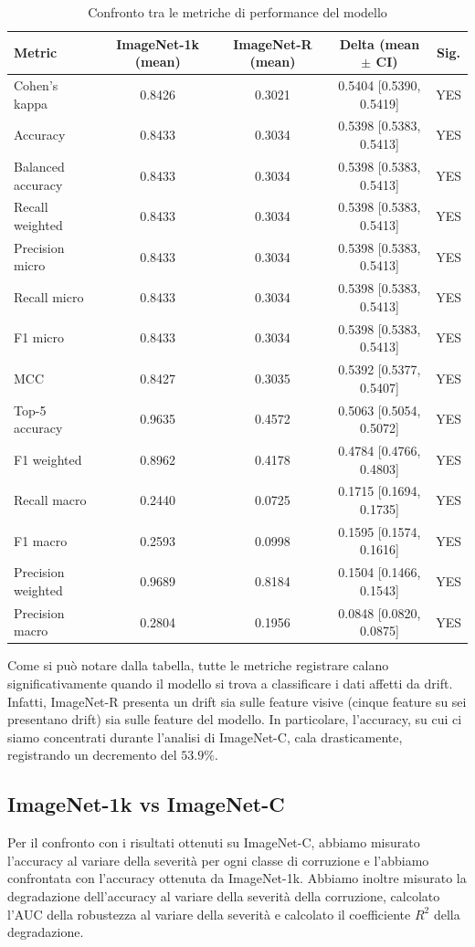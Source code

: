 \begin{table}[htbp]
\centering
\begin{tabular}{lcccc}
\hline
\textbf{Metric} & \textbf{ImageNet-1k (mean)} & \textbf{ImageNet-R (mean)} & \textbf{Delta (mean $\pm$ CI)} & \textbf{Sig.} \\
\hline
Cohen's kappa       & 0.8426 & 0.3021 & 0.5404 [0.5390, 0.5419] & YES \\
Accuracy            & 0.8433 & 0.3034 & 0.5398 [0.5383, 0.5413] & YES \\
Balanced accuracy   & 0.8433 & 0.3034 & 0.5398 [0.5383, 0.5413] & YES \\
Recall weighted     & 0.8433 & 0.3034 & 0.5398 [0.5383, 0.5413] & YES \\
Precision micro     & 0.8433 & 0.3034 & 0.5398 [0.5383, 0.5413] & YES \\
Recall micro        & 0.8433 & 0.3034 & 0.5398 [0.5383, 0.5413] & YES \\
F1 micro            & 0.8433 & 0.3034 & 0.5398 [0.5383, 0.5413] & YES \\
MCC                 & 0.8427 & 0.3035 & 0.5392 [0.5377, 0.5407] & YES \\
Top-5 accuracy      & 0.9635 & 0.4572 & 0.5063 [0.5054, 0.5072] & YES \\
F1 weighted         & 0.8962 & 0.4178 & 0.4784 [0.4766, 0.4803] & YES \\
Recall macro        & 0.2440 & 0.0725 & 0.1715 [0.1694, 0.1735] & YES \\
F1 macro            & 0.2593 & 0.0998 & 0.1595 [0.1574, 0.1616] & YES \\
Precision weighted  & 0.9689 & 0.8184 & 0.1504 [0.1466, 0.1543] & YES \\
Precision macro     & 0.2804 & 0.1956 & 0.0848 [0.0820, 0.0875] & YES \\
\hline
\end{tabular}
\caption{Confronto tra le metriche di performance del modello}
\label{tab:base_drift_metrics}
\end{table}
Come si può notare dalla tabella, tutte le metriche registrare calano significativamente quando il modello si trova a classificare i dati affetti da drift. Infatti, ImageNet-R presenta un drift sia sulle feature visive (cinque feature su sei presentano drift) sia sulle feature del modello. In particolare, l'accuracy, su cui ci siamo concentrati durante l'analisi di ImageNet-C, cala drasticamente, registrando un decremento del $53.9\%$.
\subsection{ImageNet-1k vs ImageNet-C}
Per il confronto con i risultati ottenuti su ImageNet-C, abbiamo misurato l'accuracy al variare della severità per ogni classe di corruzione e l'abbiamo confrontata con l'accuracy ottenuta da ImageNet-1k. Abbiamo inoltre misurato la degradazione dell'accuracy al variare della severità della corruzione, calcolato l'AUC della robustezza al variare della severità e calcolato il coefficiente $R^2$ della degradazione.
